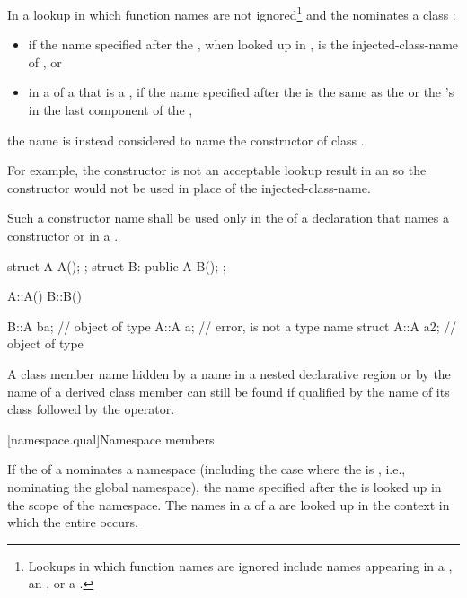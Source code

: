 \pnum
In a lookup in which function names are not ignored\footnote{Lookups in which
function names are ignored include names appearing in a
, an
, or a .}
and the  nominates a class :
\begin{itemize}
\item if the name specified after the ,
when looked up in , is the injected-class-name of , or
\item
in a  of
a  that is a ,
if the name specified after the  is the same as the
 or the 's
 in the last component of the ,
\end{itemize}
the name is instead considered to name the
constructor of class .
\begin{note}
For example, the constructor
is not an acceptable lookup result in an
 so the constructor would not be
used in place of the injected-class-name.
\end{note}
Such a constructor
name shall be used only in the  of a declaration
that names a constructor or in a .
\begin{example}
\begin{codeblock}
struct A { A(); };
struct B: public A { B(); };

A::A() { }
B::B() { }

B::A ba;            // object of type 
A::A a;             // error,  is not a type name
struct A::A a2;     // object of type 
\end{codeblock}
\end{example}

\pnum
A class member name hidden by a name in a nested declarative region or
by the name of a derived class member can still be found if qualified by
the name of its class followed by the \tcode{::} operator.

[namespace.qual]{Namespace members}

\pnum
{}%
If the  of a 
nominates a namespace (including the case where the
 is \tcode{::}, i.e., nominating
the global namespace), the name specified after the
 is looked up in the scope of the
namespace.
The names in a  of a
 are looked up in the context in which the
entire  occurs.

